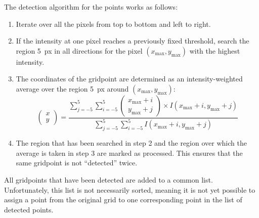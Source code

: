 The detection algorithm for the points works as follows:
\begin{enumerate}
    \item Iterate over all the pixels from top to bottom and left to right.
    \item If the intensity at one pixel reaches a previously fixed threshold, search the region \SI{5}{px} in all directions for the pixel $(x_\text{max},y_\text{max})$ with the highest intensity.
    \item The coordinates of the gridpoint are determined as an intensity-weighted average over the region \SI{5}{px} around $(x_\text{max},y_\text{max})$: \[\begin{pmatrix}
        x \\ y
    \end{pmatrix} = \frac{\sum\limits_{j = -5}^5 \sum\limits_{i = -5}^5 \begin{pmatrix}
        x_\text{max} + i \\ y_\text{max} + j
    \end{pmatrix}\times I(x_\text{max} + i, y_\text{max} + j)}{\sum\limits_{j = -5}^5 \sum\limits_{i = -5}^5 I(x_\text{max} + i, y_\text{max} + j)} \]
    \item The region that has been searched in step 2 and the region over which the average is taken in step 3 are marked as processed. This ensures that the same gridpoint is not \enquote{detected} twice.
\end{enumerate}
%
All gridpoints that have been detected are added to a common list. Unfortunately, this list is not necessarily sorted, meaning it is not yet possible to assign a point from the original grid to one corresponding point in the list of detected points. 

